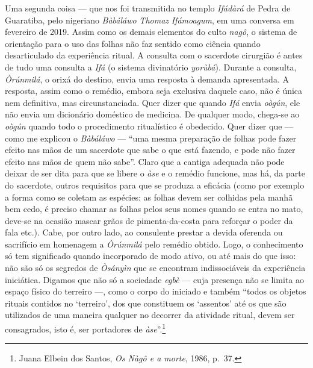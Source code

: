Uma segunda coisa --- que nos foi transmitida no templo \textit{Ifádàrá} de
Pedra de Guaratiba, pelo nigeriano \textit{Bàbáláwo} \textit{Thomaz}
\textit{Ifámoagum}, em uma conversa em fevereiro de 2019. Assim como os
demais elementos do culto \textit{nagô}, o sistema de orientação para o
uso das folhas não faz sentido como ciência quando desarticulado da
experiência ritual. A consulta com o sacerdote cirurgião é antes de tudo
uma consulta a \textit{Ifá} (o sistema divinatório \textit{yorùbá}). Durante
a consulta, \textit{Òrúnmilá}, o orixá do destino, envia uma resposta à
demanda apresentada. A resposta, assim como o remédio, embora seja
exclusiva daquele caso, não é única nem definitiva, mas circunstanciada.
Quer dizer que quando \textit{Ifá} envia \textit{oògún}, ele não envia um
dicionário doméstico de medicina. De qualquer modo, chega-se ao
\textit{oògún} quando todo o procedimento ritualístico é obedecido. Quer
dizer que --- como me explicou o \textit{Bàbáláwo} --- ``uma mesma
preparação de folhas pode fazer efeito nas mãos de um sacerdote que sabe
o que está fazendo, e pode não fazer efeito nas mãos de quem não sabe''.
Claro que a cantiga adequada não pode deixar de ser dita para que se
libere o \textit{àse} e o remédio funcione, mas há, da parte do sacerdote,
outros requisitos para que se produza a eficácia (como por exemplo a
forma como se coletam as espécies: as folhas devem ser colhidas pela
manhã bem cedo, é preciso chamar as folhas pelos seus nomes quando se
entra no mato, deve-se na ocasião mascar grãos de pimenta-da-costa para
reforçar o poder da fala etc.). Cabe, por outro lado, ao consulente
prestar a devida oferenda ou sacrifício em homenagem a \textit{Òrúnmilá}
pelo remédio obtido. Logo, o conhecimento só tem significado quando
incorporado de modo ativo, ou até mais do que isso: não são só os
segredos de \textit{Òsányìn} que se encontram indissociáveis da
experiência iniciática. Digamos que não só a sociedade \textit{egbè} ---
cuja presença não se limita ao espaço físico do terreiro ---, como o
corpo do iniciado e também ``todos os objetos rituais contidos no
`terreiro', dos que constituem os `assentos' até os que são utilizados
de uma maneira qualquer no decorrer da atividade ritual, devem ser
consagrados, isto é, ser portadores de \textit{àse}''.\footnote{Juana
  Elbein dos Santos, \textit{Os Nàgô e a morte}, 1986, p.~37.}

